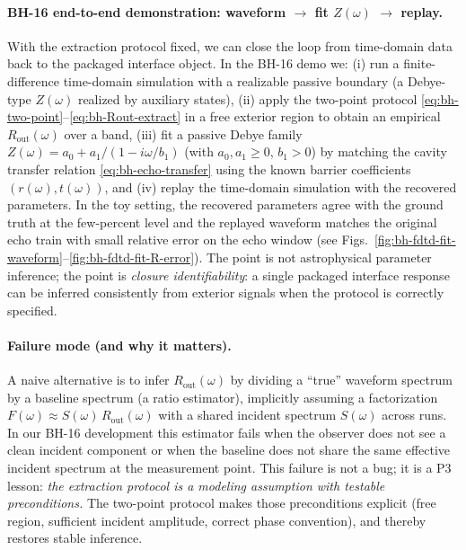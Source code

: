 \paragraph{BH-16 end-to-end demonstration: waveform $\rightarrow$ fit $Z(\omega)$ $\rightarrow$ replay.}
With the extraction protocol fixed, we can close the loop from time-domain data back to the packaged interface object. In the BH-16 demo we:
(i) run a finite-difference time-domain simulation with a realizable passive boundary (a Debye-type $Z(\omega)$ realized by auxiliary states),
(ii) apply the two-point protocol \eqref{eq:bh-two-point}--\eqref{eq:bh-Rout-extract} in a free exterior region to obtain an empirical $R_{\mathrm{out}}(\omega)$ over a band,
(iii) fit a passive Debye family $Z(\omega)=a_0+a_1/(1-i\omega/b_1)$ (with $a_0,a_1\ge 0$, $b_1>0$) by matching the cavity transfer relation \eqref{eq:bh-echo-transfer} using the known barrier coefficients $(r(\omega),t(\omega))$, and
(iv) replay the time-domain simulation with the recovered parameters.
In the toy setting, the recovered parameters agree with the ground truth at the few-percent level and the replayed waveform matches the original echo train with small relative error on the echo window (see Figs.~\ref{fig:bh-fdtd-fit-waveform}--\ref{fig:bh-fdtd-fit-R-error}). The point is not astrophysical parameter inference; the point is \emph{closure identifiability}: a single packaged interface response can be inferred consistently from exterior signals when the protocol is correctly specified.

\paragraph{Failure mode (and why it matters).}
A naive alternative is to infer $R_{\mathrm{out}}(\omega)$ by dividing a ``true'' waveform spectrum by a baseline spectrum (a ratio estimator), implicitly assuming a factorization $F(\omega)\approx S(\omega)\,R_{\mathrm{out}}(\omega)$ with a shared incident spectrum $S(\omega)$ across runs. In our BH-16 development this estimator fails when the observer does not see a clean incident component or when the baseline does not share the same effective incident spectrum at the measurement point. This failure is not a bug; it is a P3 lesson: \emph{the extraction protocol is a modeling assumption with testable preconditions.} The two-point protocol makes those preconditions explicit (free region, sufficient incident amplitude, correct phase convention), and thereby restores stable inference.


